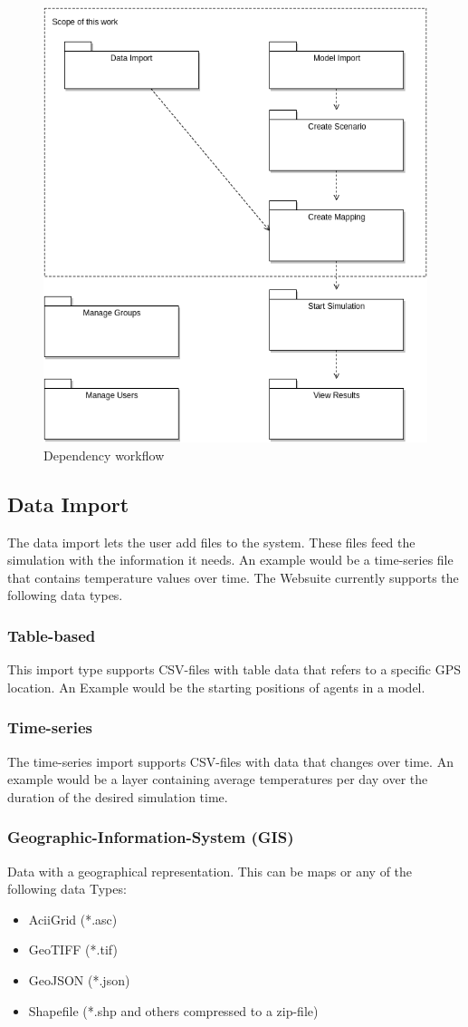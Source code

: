 \begin{figure}[H]
	\centering\includegraphics[width=.7\textwidth]{res/Dependency-workflow}
	\caption{Dependency workflow}
	\label{fig:dependency-workflow}
\end{figure}


\subsection{Data Import}
The data import lets the user add files to the system. These files feed the simulation with the information it needs. An example would be a time-series file that contains temperature values over time. The Websuite currently supports the following data types.

\subsubsection{Table-based}
This import type supports CSV-files with table data that refers to a specific GPS location. An Example would be the starting positions of agents in a model.

\subsubsection{Time-series}
The time-series import supports CSV-files with data that changes over time. An example would be a layer containing average temperatures per day over the duration of the desired simulation time.

\subsubsection{Geographic-Information-System (GIS)}
Data with a geographical representation. This can be maps or any of the following data Types:
\begin{itemize}
	\item AciiGrid (*.asc)
	\item GeoTIFF (*.tif)
	\item GeoJSON (*.json)
	\item Shapefile (*.shp and others compressed to a zip-file)
\end{itemize}


